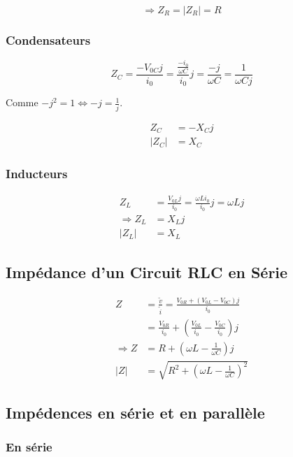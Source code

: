 \begin{multicols*}{2}
    \[ \Rightarrow Z_R = |Z_R| = R \]
    
    \subsubsection{Condensateurs}
    
    \[ Z_C = \frac{-V_{0C} j}{i_0} = \frac{\frac{-i_0}{\omega C}}{i_0} j = \frac{-j}{\omega C} = \frac{1}{\omega C j} \]
    
    Comme $-j^2 = 1 \Leftrightarrow -j = \frac{1}{j}$.
    
    \begin{align*}
        Z_C &= -X_C j \\
        |Z_C| &= X_C
    \end{align*}
    
    
    \subsubsection{Inducteurs}
    
    \begin{align*}
        Z_L &= \frac{V_{0L}j}{i_0} = \frac{\omega L i_0}{i_0}j = \omega L j \\
        \Rightarrow Z_L &= X_L j \\
        |Z_L| &= X_L
    \end{align*}
    
    \subsection{Impédance d'un Circuit RLC en Série}
    
    \begin{align*}
        Z &= \frac{\tilde v}{\tilde i} = \frac{V_{0R} + (V_{0L} - V_{0C})j}{i_0} \\
         &= \frac{V_{0R}}{i_0} + \left( \frac{V_{0L}}{i_0} - \frac{V_{0C}}{i_0} \right) j \\
         \Rightarrow Z &= R + \left(\omega L - \frac{1}{\omega C}\right)j \\
         |Z| &= \sqrt{R^2 + \left(\omega L - \frac{1}{\omega C}\right)^2}
    \end{align*}
    
    \subsection{Impédences en série et en parallèle}
    
    \subsubsection{En série}
    

\end{multicols*}
